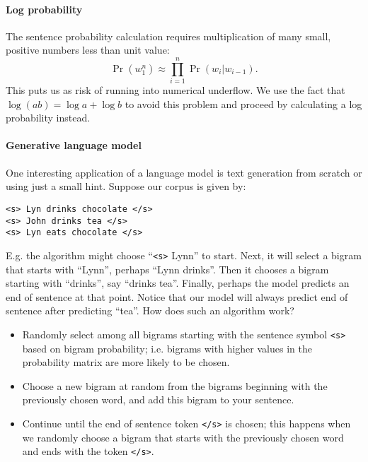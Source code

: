 \documentclass[12pt]{article}
\begin{document}
\paragraph{Log probability} The sentence probability calculation requires multiplication of many small, positive numbers less than unit value:
\[
  \Pr(w_1^n) \approx \prod_{i=1}^{n} \Pr(w_i | w_{i-1}).
\]
This puts us as risk of running into numerical underflow. We use the fact that $\log (ab) = \log a + \log b$ to avoid this problem and proceed by calculating a log probability instead.

\paragraph{Generative language model} One interesting application of a language model is text generation from scratch or using just a small hint. Suppose our corpus is given by:
\begin{verbatim}
<s> Lyn drinks chocolate </s>
<s> John drinks tea </s>
<s> Lyn eats chocolate </s>
\end{verbatim}
E.g. the algorithm might choose ``\texttt{<s>} Lynn'' to start. Next, it will select a bigram that starts with ``Lynn'', perhaps ``Lynn drinks''. Then it chooses a bigram starting with ``drinks'', say ``drinks tea''. Finally, perhaps the model predicts an end of sentence at that point. Notice that our model will always predict end of sentence after predicting ``tea''. How does such an algorithm work?
\begin{itemize}
\item Randomly select among all bigrams starting with the sentence symbol   \texttt{<s>} based on bigram probability; i.e. bigrams with higher values in the probability matrix are more likely to be chosen.
\item Choose a new bigram at random from the bigrams beginning with the   previously chosen word, and add this bigram to your sentence.
\item Continue until the end of sentence token \texttt{</s>} is chosen; this happens when we randomly choose a bigram that starts with the previously chosen word and ends with the token \texttt{</s>}.
\end{itemize}
\end{document}
